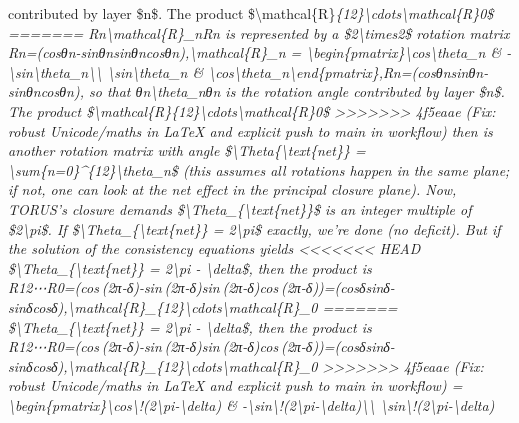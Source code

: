 \documentclass[]{article}
\begin{document}
contributed by layer \$n\$. The product
\$\textbackslash mathcal\{R\}\emph{\{12\}\textbackslash cdots\textbackslash mathcal\{R\}0\$
=======
Rn\textbackslash{}mathcal\{R\}\_nRn​ is represented by a
\$2\textbackslash{}times2\$ rotation matrix\\
Rn=(cos⁡θn-sin⁡θnsin⁡θncos⁡θn),\textbackslash{}mathcal\{R\}\_n =
\textbackslash{}begin\{pmatrix\}\textbackslash{}cos\textbackslash{}theta\_n
\&
-\textbackslash{}sin\textbackslash{}theta\_n\textbackslash{}\textbackslash{}
\textbackslash{}sin\textbackslash{}theta\_n \&
\textbackslash{}cos\textbackslash{}theta\_n\textbackslash{}end\{pmatrix\},Rn​=(cosθn​sinθn​​-sinθn​cosθn​​),
so that θn\textbackslash{}theta\_nθn​ is the rotation angle contributed
by layer \$n\$. The product
\$\textbackslash{}mathcal\{R\}\emph{\{12\}\textbackslash{}cdots\textbackslash{}mathcal\{R\}0\$
>>>>>>> 4f5eaae (Fix: robust Unicode/maths in LaTeX and explicit push to main in workflow)
then is another rotation matrix with angle
\$\textbackslash{}Theta\{\textbackslash{}text\{net\}\} =
\textbackslash{}sum}\{n=0\}\^{}\{12\}\textbackslash{}theta\_n\$ (this
assumes all rotations happen in the same plane; if not, one can look at
the net effect in the principal closure plane). Now, TORUS's closure
demands \$\textbackslash{}Theta\_\{\textbackslash{}text\{net\}\}\$ is an
integer multiple of \$2\textbackslash{}pi\$. If
\$\textbackslash{}Theta\_\{\textbackslash{}text\{net\}\} =
2\textbackslash{}pi\$ exactly, we're done (no deficit). But if the
solution of the consistency equations yields
<<<<<<< HEAD
\$\textbackslash Theta\_\{\textbackslash text\{net\}\} =
2\textbackslash pi - \textbackslash delta\$, then the product is\\
R12⋯R0=(cos⁡ ⁣(2π-δ)-sin⁡ ⁣(2π-δ)sin⁡ ⁣(2π-δ)cos⁡ ⁣(2π-δ))=(cos⁡δsin⁡δ-sin⁡δcos⁡δ),\textbackslash mathcal\{R\}\_\{12\}\textbackslash cdots\textbackslash mathcal\{R\}\_0
=======
\$\textbackslash{}Theta\_\{\textbackslash{}text\{net\}\} =
2\textbackslash{}pi - \textbackslash{}delta\$, then the product is\\
R12⋯R0=(cos⁡ ⁣(2π-δ)-sin⁡ ⁣(2π-δ)sin⁡ ⁣(2π-δ)cos⁡ ⁣(2π-δ))=(cos⁡δsin⁡δ-sin⁡δcos⁡δ),\textbackslash{}mathcal\{R\}\_\{12\}\textbackslash{}cdots\textbackslash{}mathcal\{R\}\_0
>>>>>>> 4f5eaae (Fix: robust Unicode/maths in LaTeX and explicit push to main in workflow)
=
\textbackslash{}begin\{pmatrix\}\textbackslash{}cos\textbackslash{}!(2\textbackslash{}pi-\textbackslash{}delta)
\&
-\textbackslash{}sin\textbackslash{}!(2\textbackslash{}pi-\textbackslash{}delta)\textbackslash{}\textbackslash{}
\textbackslash{}sin\textbackslash{}!(2\textbackslash{}pi-\textbackslash{}delta)
}
\end{document}
